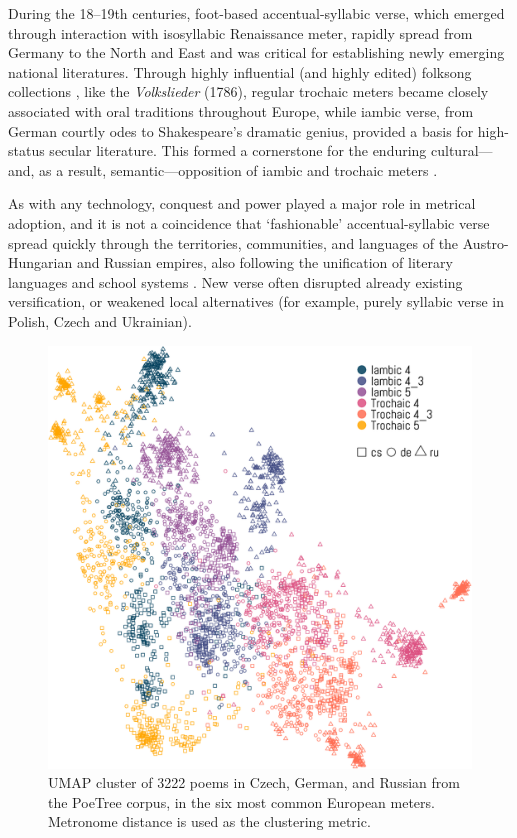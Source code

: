 \documentclass[
    hf
]{ceurart}
\begin{document}
During the 18--19th centuries, foot-based accentual-syllabic verse, which emerged through interaction with isosyllabic
Renaissance meter, rapidly spread from Germany to the North and East \cite[207-209]{gasparov_history_1996}
\cite{kazartsev_iambic_2022} and was critical for establishing newly emerging national literatures. Through highly
influential (and highly edited) folksong collections  \cite{abrahams_phantoms_1993,leerssen_oral_2012}, like the
\textit{Volkslieder} (1786), regular trochaic meters became closely associated with oral traditions throughout Europe,
while iambic verse, from German courtly odes to Shakespeare's dramatic genius, provided a basis for high-status
secular literature. This formed a cornerstone for the  enduring cultural---and, as a result, semantic---opposition of
iambic and trochaic meters \cite{sela_semantics_2022}.

As with any technology, conquest and power played a major role in metrical adoption, and it is not a coincidence that `fashionable' accentual-syllabic verse spread quickly through the territories, communities, and languages of the Austro-Hungarian and Russian empires, also following the unification of literary languages and school systems \cite[238-239]{gasparov_history_1996}. New verse often disrupted already existing versification, or weakened local alternatives (for example, purely syllabic verse in Polish, Czech and Ukrainian).

\begin{figure}
    \includegraphics[width=\linewidth]{figures/crosslang_cluster-crop.pdf}
    \caption{UMAP cluster of 3222 poems in Czech, German, and Russian from the PoeTree corpus, in the six most common European meters. Metronome distance is used as the clustering metric.}
    \label{fig:crosslang}
\end{figure}
\end{document}
